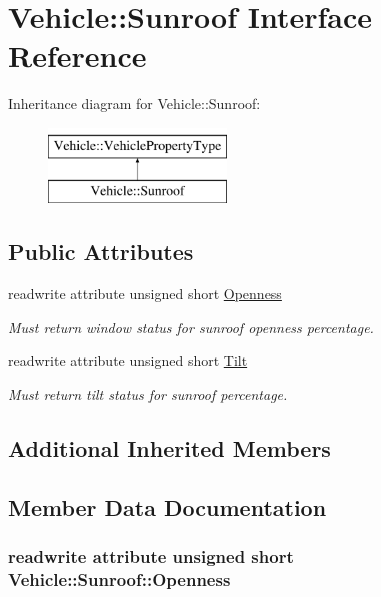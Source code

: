 \hypertarget{interfaceVehicle_1_1Sunroof}{\section{Vehicle\-:\-:Sunroof Interface Reference}
\label{interfaceVehicle_1_1Sunroof}
}
Inheritance diagram for Vehicle\-:\-:Sunroof\-:\begin{figure}[H]
\begin{center}
\leavevmode
\includegraphics[height=2.000000cm]{interfaceVehicle_1_1Sunroof}
\end{center}
\end{figure}
\subsection*{Public Attributes}
\begin{DoxyCompactItemize}
\item 
readwrite attribute unsigned short \hyperlink{interfaceVehicle_1_1Sunroof_a4c247eb07497b5d6bb363b6944ff680c}{Openness}
\begin{DoxyCompactList}\small\item\em Must return window status for sunroof openness percentage. \end{DoxyCompactList}\item 
readwrite attribute unsigned short \hyperlink{interfaceVehicle_1_1Sunroof_a7a6dbebaf54923cdc9a539113c2b4e3b}{Tilt}
\begin{DoxyCompactList}\small\item\em Must return tilt status for sunroof percentage. \end{DoxyCompactList}\end{DoxyCompactItemize}
\subsection*{Additional Inherited Members}


\subsection{Member Data Documentation}
\hypertarget{interfaceVehicle_1_1Sunroof_a4c247eb07497b5d6bb363b6944ff680c}{
\subsubsection[{Openness}]{\setlength{\rightskip}{0pt plus 5cm}readwrite attribute unsigned short Vehicle\-::\-Sunroof\-::\-Openness}}\label{interfaceVehicle_1_1Sunroof_a4c247eb07497b5d6bb363b6944ff680c}


